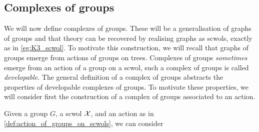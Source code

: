 \subsection{Complexes of groups}
We will now define complexes of groups.
These will be a generalisation of graphs of groups and that theory can be recovered by realising graphs as scwols, exactly as in \cref{eg:K3_scwol}.
To motivate this construction, we will recall that graphs of groups emerge from actions of groups on trees.
Complexes of groups \emph{sometimes} emerge from an action of a group on a scwol, such a complex of groups is called \emph{developable}.
The general definition of a complex of groups abstracts the properties of developable complexes of groups.
To motivate these properties, we will consider first the construction of a complex of groups associated to an action.

Given a group $G$, a scwol $\mathcal{X}$, and an action as in \cref{def:action_of_groups_on_scwols}, we can consider



